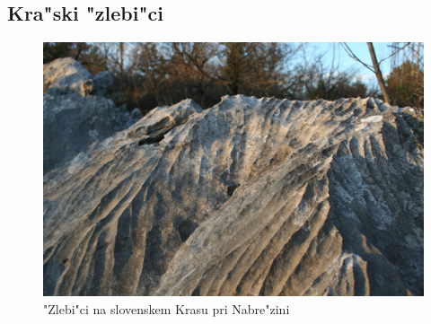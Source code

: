 \documentclass[a4paper,10pt]{article}
\begin{document}

\subsection{Kra"ski "zlebi"ci}


\begin{figure}[h]
\centering
 \includegraphics[width=.8\textwidth]{./Slike/Zlebici}
 \caption{"Zlebi"ci na slovenskem Krasu pri Nabre"zini~\cite{wiki:zlebic} }
 \label{fig:zlebici-slika}
\end{figure}
\end{document}

